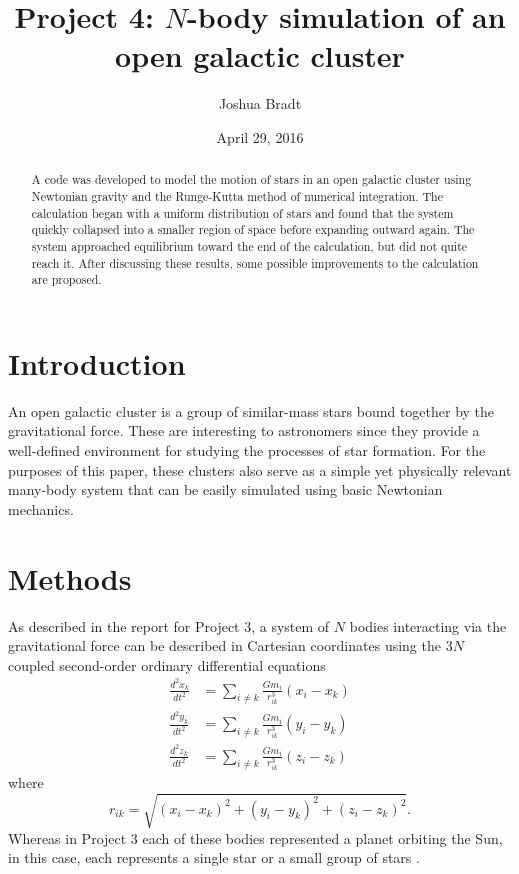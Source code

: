 \documentclass[aps,prc,reprint,floatfix,nobalancelastpage]{revtex4-1}
\begin{document}
\title{Project 4: $N$-body simulation of an open galactic cluster}
\author{Joshua Bradt}
\noaffiliation
\date{April 29, 2016}

\begin{abstract}
    A code was developed to model the motion of stars in an open galactic cluster using Newtonian gravity and the Runge-Kutta method of numerical integration. The calculation began with a uniform distribution of stars and found that the system quickly collapsed into a smaller region of space before expanding outward again. The system approached equilibrium toward the end of the calculation, but did not quite reach it. After discussing these results, some possible improvements to the calculation are proposed.
\end{abstract}

\maketitle

\section{Introduction}
\label{sec:introduction}

    An open galactic cluster is a group of similar-mass stars bound together by the gravitational force. These are interesting to astronomers since they provide a well-defined environment for studying the processes of star formation. \cite{Hjorth-Jensen2016} For the purposes of this paper, these clusters also serve as a simple yet physically relevant many-body system that can be easily simulated using basic Newtonian mechanics.

\section{Methods}
\label{sec:methods}

    As described in the report for Project 3, a system of $N$ bodies interacting via the gravitational force can be described in Cartesian coordinates using the $3N$ coupled second-order ordinary differential equations \cite{Project3}
    \begin{align*}
        \frac{d^2 x_k}{dt^2} &= \sum_{i \neq k} \frac{G m_i}{r_{ik}^3} (x_i - x_k) \\
        \frac{d^2 y_k}{dt^2} &= \sum_{i \neq k} \frac{G m_i}{r_{ik}^3} (y_i - y_k) \\
        \frac{d^2 z_k}{dt^2} &= \sum_{i \neq k} \frac{G m_i}{r_{ik}^3} (z_i - z_k)
    \end{align*}
    where
    \begin{equation*}
        r_{ik} = \sqrt{(x_i - x_k)^2 + (y_i - y_k)^2 + (z_i - z_k)^2}.
    \end{equation*}
    Whereas in Project 3 each of these bodies represented a planet orbiting the Sun, in this case, each represents a single star or a small group of stars \cite{Hjorth-Jensen2016}.
\end{document}

